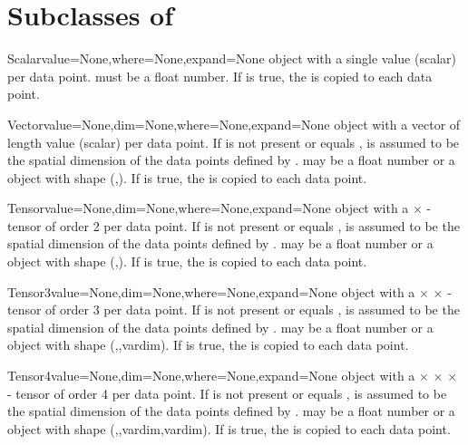 \section{Subclasses of }
\begin{classdesc}{Scalar}{value=None,where=None,expand=None}
\Data object with a single value (scalar) per data
point.  must be a float number.  If  is true,
the  is copied to each data point.
\end{classdesc}

\begin{classdesc}{Vector}{value=None,dim=None,where=None,expand=None}
\Data object with a vector of length  value (scalar)
per data point.  If  is not present or equals ,
 is assumed to be the spatial dimension of the data points
defined by .  may be a float number or a
 object with shape (,).  If
 is true, the  is copied to each data point.
\end{classdesc}

\begin{classdesc}{Tensor}{value=None,dim=None,where=None,expand=None}
\Data object with a  $\times$  - tensor of
order 2 per data point.  If  is not present or equals
,  is assumed to be the spatial dimension of the
data points defined by .  may be a float number
or a  object with shape (,).
If  is true, the  is copied to each data point.
\end{classdesc}

\begin{classdesc}{Tensor3}{value=None,dim=None,where=None,expand=None}
\Data object with a  $\times$  $\times$
 - tensor of order 3 per data point.  If  is not
present or equals ,  is assumed to be the spatial
dimension of the data points defined by .  may
be a float number or a  object with shape
(,,var{dim}).  If  is true, the
 is copied to each data point.
\end{classdesc}

\begin{classdesc}{Tensor4}{value=None,dim=None,where=None,expand=None}
\Data object with a  $\times$  $\times$
 $\times$  - tensor of order 4 per data point.  If
 is not present or equals ,  is assumed to
be the spatial dimension of the data points defined by
.  may be a float number or a
 object with shape
(,,var{dim},var{dim}).  If  is true, the
 is copied to each data point.
\end{classdesc}
